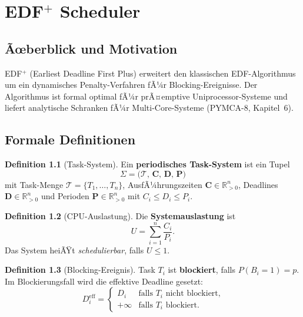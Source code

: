 ﻿\documentclass[a4paper,12pt]{scrreprt}
\theoremstyle{definition}
\newtheorem{definition}{Definition}[chapter]
\begin{document}
	\chapter{\texorpdfstring{EDF$^+$}{EDF+} Scheduler}
	
	\section{Ãœberblick und Motivation}
	
	EDF$^+$ (Earliest Deadline First Plus) \cite{Epp2026edfplus} erweitert den
	klassischen EDF-Algorithmus \cite{Liu1973} um ein dynamisches
	Penalty-Verfahren fÃ¼r Blocking-Ereignisse. Der Algorithmus ist formal
	optimal fÃ¼r prÃ¤emptive Uniprocessor-Systeme und liefert analytische
	Schranken fÃ¼r Multi-Core-Systeme (PYMCA-8, Kapitel~6).
	
	\section{Formale Definitionen}
	
	\begin{definition}[Task-System]
		Ein \textbf{periodisches Task-System} ist ein Tupel
		\[
		\Sigma = \bigl(\mathcal{T},\, \mathbf{C},\, \mathbf{D},\, \mathbf{P}\bigr)
		\]
		mit Task-Menge $\mathcal{T} = \{T_1, \ldots, T_n\}$,
		AusfÃ¼hrungszeiten $\mathbf{C} \in \mathbb{R}_{>0}^n$,
		Deadlines $\mathbf{D} \in \mathbb{R}_{>0}^n$ und
		Perioden $\mathbf{P} \in \mathbb{R}_{>0}^n$ mit $C_i \leq D_i \leq P_i$.
	\end{definition}
	
	\begin{definition}[CPU-Auslastung]
		Die \textbf{Systemauslastung} ist
		\[
		U = \sum_{i=1}^{n} \frac{C_i}{P_i}.
		\]
		Das System heiÃŸt \emph{schedulierbar}, falls $U \leq 1$.
	\end{definition}
	
	\begin{definition}[Blocking-Ereignis]
		Task $T_i$ ist \textbf{blockiert}, falls $P(B_i = 1) = p$. Im
		Blockierungsfall wird die effektive Deadline gesetzt:
		\[
		D_i^{\mathrm{eff}} = \begin{cases}
			D_i & \text{falls } T_i \text{ nicht blockiert,} \\
			+\infty & \text{falls } T_i \text{ blockiert.}
		\end{cases}
		\]
	\end{definition}
	
\end{document}
